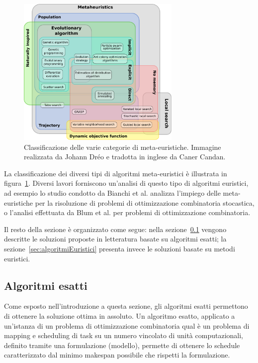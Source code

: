 \begin{figure}[t!]
 \begin{center}
  \includegraphics[width=0.7\textwidth]
  {capitoli/figure/cap3/MetaheuristicsClassification.pdf}
  \caption[Classificazione degli algoritmi meta-euristici]{Classificazione delle
  varie categorie di meta-euristiche. Immagine 
realizzata da Johann Dréo \cite{MetaheuristicsClassifications} e tradotta in inglese da Caner Candan.}
\label{fig:metaheuristicsClassification}
 \end{center}
\end{figure}


La classificazione dei diversi tipi di algoritmi meta-euristici è illustrata in 
figura~\ref{fig:metaheuristicsClassification}. Diversi lavori forniscono 
un'analisi di questo tipo di algoritmi euristici, ad esempio lo studio condotto 
da Bianchi et al. \cite{SurveyMetaheuristicSCOP} analizza l'impiego delle 
meta-euristiche per la risoluzione di problemi di ottimizzazione combinatoria stocastica,
o l'analisi effettuata da Blum 
et al. \cite{MetaheuristicCombinatorialOptimization} per problemi di 
ottimizzazione combinatoria.

Il resto della sezione è organizzato come segue: nella
sezione~\ref{sec:algoritmiEsatti} vengono descritte le soluzioni proposte in letteratura 
basate su algoritmi esatti; la
sezione~\ref{sec:algoritmiEuristici} presenta invece le soluzioni basate su metodi 
euristici.


\subsection{Algoritmi esatti}
\label{sec:algoritmiEsatti}
Come esposto nell'introduzione a questa sezione, gli algoritmi esatti 
permettono di ottenere la soluzione ottima in assoluto. Un algoritmo esatto, 
applicato a un'istanza di un problema di ottimizzazione combinatoria qual è un
problema di mapping e scheduling di task su un numero vincolato di unit\`a computazionali,
definito tramite una formulazione (modello), permette di ottenere lo schedule
caratterizzato dal minimo makespan possibile che rispetti la formulazione. 

